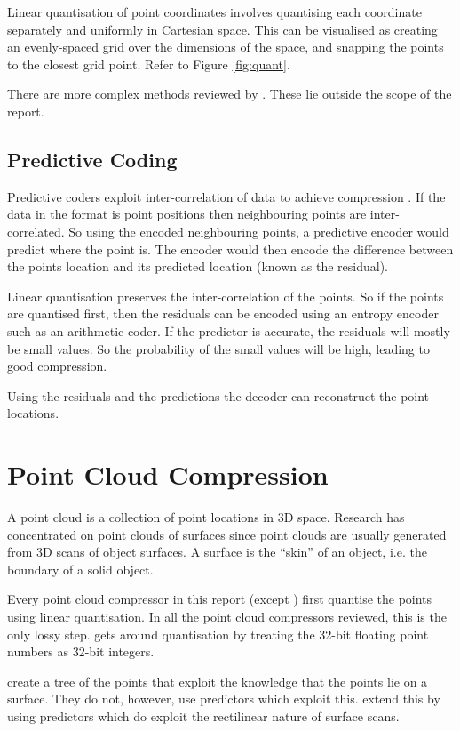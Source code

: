 \documentclass[a4paper]{report}
\begin{document}
Linear quantisation of point coordinates involves quantising each coordinate
separately and uniformly in Cartesian space. This can be visualised as
creating an evenly-spaced grid over the dimensions of the space, and snapping
the points to the closest grid point. Refer to Figure \ref{fig:quant}.

There are more complex methods reviewed by \citet{ag-racm-03}. These lie
outside the scope of the report.


\subsection{Predictive Coding}

Predictive coders exploit inter-correlation of data to achieve compression
\citep{drozdek}. If the data in the format is point positions then
neighbouring points are inter-correlated. So using the encoded neighbouring
points, a predictive encoder would predict where the point is. The encoder
would then encode the difference between the points location and its predicted
location (known as the residual).

Linear quantisation preserves the inter-correlation of the points. So if the
points are quantised first, then the residuals can be encoded using an entropy
encoder such as an arithmetic coder. If the predictor is accurate, the
residuals will mostly be small values. So the probability of the small values
will be high, leading to good compression.

Using the residuals and the predictions the decoder can reconstruct the point
locations.


\section{Point Cloud Compression}

A point cloud is a collection of point locations in 3D space. Research has
concentrated on point clouds of surfaces since point clouds are usually
generated from 3D scans of object surfaces. A surface is the ``skin'' of an
object, i.e. the boundary of a solid object.

Every point cloud compressor in this report (except \citet{chen2005lcp}) first
quantise the points using linear quantisation. In all the point cloud
compressors reviewed, this is the only lossy step. \citet{chen2005lcp} gets
around quantisation by treating the 32-bit floating point numbers as 32-bit
integers.

\citet{gumholdcomp} create a tree of the points that exploit the knowledge that
the points lie on a surface. They do not, however, use predictors which
exploit this. \citet{merrycomp} extend this by using predictors which do
exploit the rectilinear nature of surface scans.
\end{document}
